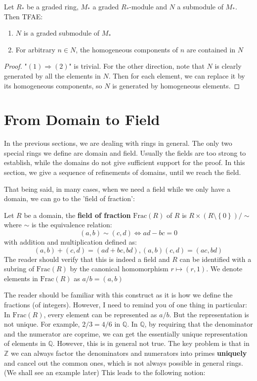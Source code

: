 \documentclass{note-eng}
\begin{document}
\begin{proposition}
    Let $R_\ast$ be a graded ring, $M_\ast$ a graded $R_\ast$-module and $N$ a submodule of $M_\ast$. Then TFAE:
    \begin{enumerate}
        \item $N$ is a graded submodule of $M_\ast$
        \item For arbitrary $n \in N$, the homogeneous components of $n$ are contained in $N$ 
    \end{enumerate}
\end{proposition}

\begin{proof}
    "$(1) \Rightarrow (2)$" is trivial. For the other direction, note that $N$ is clearly generated by all the elements in $N$. Then for each element, we can replace it by its homogeneous components, so $N$ is generated by homogeneous elements.
\end{proof}


\section{From Domain to Field}

In the previous sections, we are dealing with rings in general. The only two special rings we define are domain and field. Usually the fields are too strong to establish, while the domains do not give sufficient support for the proof. In this section, we give a sequence of refinements of domains, until we reach the field.

That being said, in many cases, when we need a field while we only have a domain, we can go to the 'field of fraction':

\begin{definition}
    Let $R$ be a domain, the \textbf{field of fraction} $\mathrm{Frac}(R)$ of $R$ is $R \times (R \setminus \left\lbrace 0 \right\rbrace) / \sim$ where $\sim$ is the equivalence relation:
    $$(a, b) \sim (c, d) \Leftrightarrow ad - bc = 0$$
    with addition and multiplication defined as:
    $$(a, b) + (c, d) = (ad + bc, bd), (a, b)(c, d) = (ac, bd)$$
    The reader should verify that this is indeed a field and $R$ can be identified with a subring of $\mathrm{Frac}(R)$ by the canonical homomorphism $r \mapsto (r, 1)$. We denote elements in $\mathrm{Frac}(R)$ as $a / b = (a, b)$
\end{definition}

The reader should be familiar with this construct as it is how we define the fractions (of integers). However, I need to remind you of one thing in particular: In $\mathrm{Frac}(R)$, every element can be represented as $a / b$. But the representation is not unique. For example, $2 / 3 = 4 / 6$ in $\mathbb{Q}$. In $\mathbb{Q}$, by requiring that the denominator and the numerator are coprime, we can get the essentially unique representation of elements in $\mathbb{Q}$. However, this is in general not true. The key problem is that in $\mathbb{Z}$ we can always factor the denominators and numerators into primes \textbf{uniquely} and cancel out the common ones, which is not always possible in general rings. (We shall see an example later) This leads to the following notion:
\end{document}
